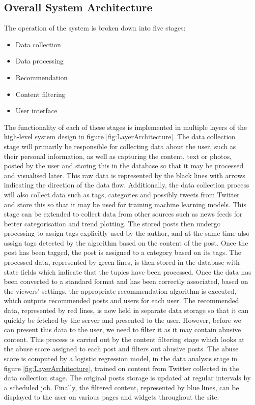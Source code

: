 \subsection{Overall System Architecture}
The operation of the system is broken down into five stages: 

\begin{itemize}
\item Data collection
\item Data processing
\item Recommendation
\item Content filtering 
\item User interface
\end{itemize}

The functionality of each of these stages is implemented in multiple layers of the high-level system design in figure \ref{fig:LayerArchitecture}. The data collection stage will primarily be responsible for collecting data about the user, such as their personal information, as well as capturing the content, text or photos, posted by the user and storing this in the database so that it may be processed and visualised later. This raw data is represented by the black lines with arrows indicating the direction of the data flow. Additionally, the data collection process will also collect data such as tags, categories and possibly tweets from Twitter and store this so that it may be used for training machine learning models. This stage can be extended to collect data from other sources such as news feeds for better categorisation and trend plotting. The stored posts then undergo processing to assign tags explicitly used by the author, and at the same time also assign tags detected by the algorithm based on the content of the post. Once the post has been tagged, the post is assigned to a category based on its tags. The processed data, represented by green lines, is then stored in the database with state fields which indicate that the tuples have been processed. Once the data has been converted to a standard format and has been correctly associated, based on the viewers' settings, the appropriate recommendation algorithm is executed, which outputs recommended posts and users for each user. The recommended data, represented by red lines, is now held in separate data storage so that it can quickly be fetched by the server and presented to the user. However, before we can present this data to the user, we need to filter it as it may contain abusive content. This process is carried out by the content filtering stage which looks at the abuse score assigned to each post and filters out abusive posts. The abuse score is computed by a logistic regression model, in the data analysis stage in figure \ref{fig:LayerArchitecture}, trained on content from Twitter collected in the data collection stage. The original posts storage is updated at regular intervals by a scheduled job. Finally, the filtered content, represented by blue lines, can be displayed to the user on various pages and widgets throughout the site. 

